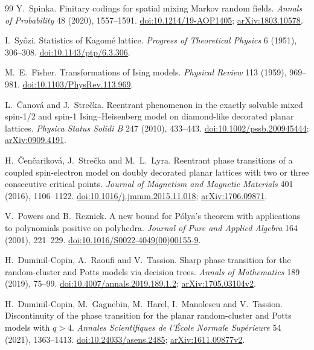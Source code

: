 \begin{thebibliography}{99}
 Y.~Spinka.
Finitary codings for spatial mixing Markov random fields.
\emph{Annals of Probability} 48 (2020), 1557--1591.
\href{https://doi.org/10.1214/19-AOP1405}{doi:10.1214/19-AOP1405};
\href{https://arxiv.org/abs/1803.10578}{arXiv:1803.10578}.

 I.~Sy\^ozi.
Statistics of Kagom\'e lattice.
\emph{Progress of Theoretical Physics} 6 (1951), 306--308.
\href{https://doi.org/10.1143/ptp/6.3.306}{doi:10.1143/ptp/6.3.306}.

 M.~E.~Fisher.
Transformations of Ising models.
\emph{Physical Review} 113 (1959), 969--981.
\href{https://doi.org/10.1103/PhysRev.113.969}{doi:10.1103/PhysRev.113.969}.

 L.~\v{C}anov\'a and J.~Stre\v{c}ka.
Reentrant phenomenon in the exactly solvable mixed spin-1/2 and spin-1
Ising--Heisenberg model on diamond-like decorated planar lattices.
\emph{Physica Status Solidi B} 247 (2010), 433--443.
\href{https://doi.org/10.1002/pssb.200945444}{doi:10.1002/pssb.200945444};
\href{https://arxiv.org/abs/0909.4191}{arXiv:0909.4191}.

 H.~\v{C}en\v{c}arikov\'a, J.~Stre\v{c}ka and M.~L.~Lyra.
Reentrant phase transitions of a coupled spin-electron model on doubly decorated
planar lattices with two or three consecutive critical points.
\emph{Journal of Magnetism and Magnetic Materials} 401 (2016), 1106--1122.
\href{https://doi.org/10.1016/j.jmmm.2015.11.018}{doi:10.1016/j.jmmm.2015.11.018};
\href{https://arxiv.org/abs/1706.09871}{arXiv:1706.09871}.

 V.~Powers and B.~Reznick.
A new bound for P\'olya's theorem with applications to polynomials positive on polyhedra.
\emph{Journal of Pure and Applied Algebra} 164 (2001), 221--229.
\href{https://doi.org/10.1016/S0022-4049(00)00155-9}{doi:10.1016/S0022-4049(00)00155-9}.

 H.~Duminil-Copin, A.~Raoufi and V.~Tassion.
Sharp phase transition for the random-cluster and Potts models via decision trees.
\emph{Annals of Mathematics} 189 (2019), 75--99.
\href{https://doi.org/10.4007/annals.2019.189.1.2}{doi:10.4007/annals.2019.189.1.2};
\href{https://arxiv.org/abs/1705.03104v2}{arXiv:1705.03104v2}.

 H.~Duminil-Copin, M.~Gagnebin, M.~Harel, I.~Manolescu and V.~Tassion.
Discontinuity of the phase transition for the planar random-cluster and Potts models with \(q>4\).
\emph{Annales Scientifiques de l'\'Ecole Normale Sup\'erieure} 54 (2021), 1363--1413.
\href{https://doi.org/10.24033/asens.2485}{doi:10.24033/asens.2485};
\href{https://arxiv.org/abs/1611.09877v2}{arXiv:1611.09877v2}.


\end{thebibliography}
